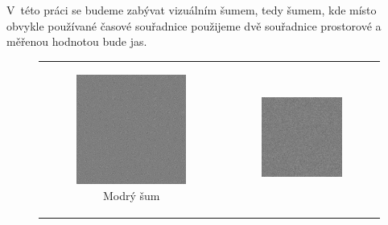 V~této práci se budeme zabývat vizuálním šumem, tedy šumem, kde místo obvykle
používané časové souřadnice použijeme dvě souřadnice prostorové a měřenou
hodnotou bude jas. 

\begin{figure}[h!]
\begin{tabular}{cc}
\begin{subfigure}{0.45\textwidth}
  \centering
  \includegraphics[width=.8\linewidth]{img/blue_noise}
  \caption{Modrý šum} 
\end{subfigure}&
\begin{subfigure}{0.45\textwidth}
  \centering
  \includegraphics[width=.8\linewidth]{img/white_noise}

\end{subfigure}
\end{tabular}
\end{figure}
